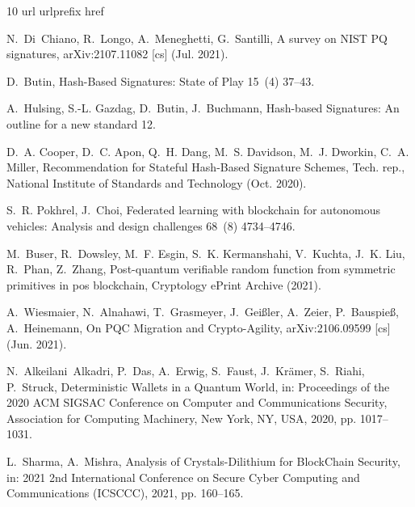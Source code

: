 \documentclass[lettersize,journal]{IEEEtran}
\begin{document}
 \begin{thebibliography}{10}
\expandafter\ifx\csname url\endcsname\relax
  \def\url#1{\texttt{#1}}\fi
\expandafter\ifx\csname urlprefix\endcsname\relax\def\urlprefix{URL }\fi
\expandafter\ifx\csname href\endcsname\relax
  \def\href#1#2{#2} \def\path#1{#1}\fi

N.~Di~Chiano, R.~Longo, A.~Meneghetti, G.~Santilli, A survey on {{NIST PQ}}
  signatures, arXiv:2107.11082 [cs] (Jul. 2021).


D.~Butin, Hash-{{Based Signatures}}: {{State}} of {{Play}} 15~(4)  37--43.


A.~Hulsing, S.-L. Gazdag, D.~Butin, J.~Buchmann, Hash-based {{Signatures}}:
  {{An}} outline for a new standard  12.

D.~A. Cooper, D.~C. Apon, Q.~H. Dang, M.~S. Davidson, M.~J. Dworkin, C.~A.
  Miller, Recommendation for {{Stateful Hash-Based Signature Schemes}}, Tech.
  rep., {National Institute of Standards and Technology} (Oct. 2020).


S.~R. Pokhrel, J.~Choi, Federated learning with blockchain for autonomous
  vehicles: Analysis and design challenges 68~(8)  4734--4746.


M.~Buser, R.~Dowsley, M.~F. Esgin, S.~K. Kermanshahi, V.~Kuchta, J.~K. Liu,
  R.~Phan, Z.~Zhang, Post-quantum verifiable random function from symmetric
  primitives in pos blockchain, Cryptology ePrint Archive (2021).

A.~Wiesmaier, N.~Alnahawi, T.~Grasmeyer, J.~Gei{\ss}ler, A.~Zeier,
  P.~Bauspie{\ss}, A.~Heinemann, On {{PQC Migration}} and {{Crypto-Agility}},
  arXiv:2106.09599 [cs] (Jun. 2021).


N.~Alkeilani~Alkadri, P.~Das, A.~Erwig, S.~Faust, J.~Kr{\"a}mer, S.~Riahi,
  P.~Struck, Deterministic {{Wallets}} in a {{Quantum World}}, in: Proceedings
  of the 2020 {{ACM SIGSAC Conference}} on {{Computer}} and {{Communications
  Security}}, {Association for Computing Machinery}, {New York, NY, USA}, 2020,
  pp. 1017--1031.

L.~Sharma, A.~Mishra, Analysis of {{Crystals-Dilithium}} for {{BlockChain
  Security}}, in: 2021 2nd {{International Conference}} on {{Secure Cyber
  Computing}} and {{Communications}} ({{ICSCCC}}), 2021, pp. 160--165.



\end{thebibliography}
\end{document}
